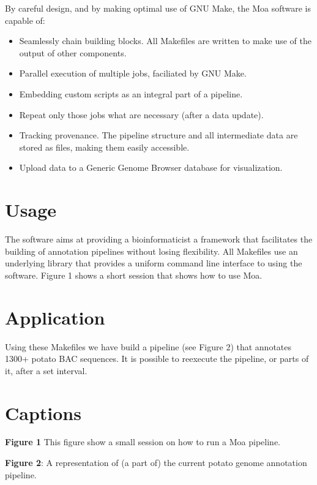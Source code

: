 \documentclass[a4paper,11pt,oneside]{article}
\begin{document}
By careful design, and by making optimal use of GNU Make, the Moa software
is capable of:
 
\begin{itemize}
\item Seamlessly chain building blocks. All Makefiles are written to
  make use of the output of other components.
\item Parallel execution of multiple jobs, faciliated by GNU Make.
\item Embedding custom scripts as an integral part of a pipeline.
\item Repeat only those jobs what are necessary (after a data update).
\item Tracking provenance. The pipeline structure and all intermediate
  data are stored as files, making them easily accessible.
\item Upload data to a Generic Genome Browser database for
  visualization.
\end{itemize}

\section{Usage}

The software aims at providing a bioinformaticist a framework that
facilitates the building of annotation pipelines without losing
flexibility. All Makefiles use an underlying library that provides a
uniform command line interface to using the software. Figure 1 shows a
short session that shows how to use Moa.

\section{Application}

Using these Makefiles we have build a pipeline (see Figure 2) that
annotates 1300+ potato BAC sequences. It is possible to reexecute the
pipeline, or parts of it, after a set interval. 

\section{Captions}

\textbf{Figure 1} This figure show a small session on how to run a Moa pipeline. 


\textbf{Figure 2}: A representation of (a part of) the current potato
genome annotation pipeline.

%
%
\end{document}
